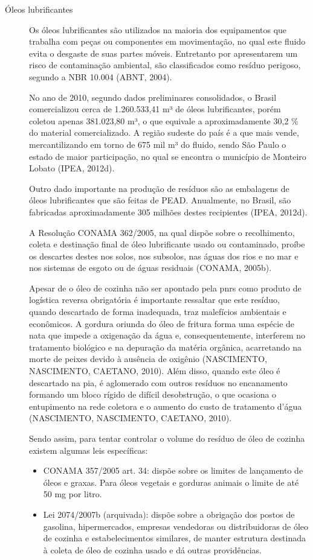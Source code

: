 \begin{description}
	
	\item[Óleos lubrificantes]	Os óleos lubrificantes são utilizados na maioria dos equipamentos que trabalha com peças ou componentes em movimentação, no qual este fluido evita o desgaste de suas partes móveis. Entretanto por apresentarem um risco de contaminação ambiental, são classificados como resíduo perigoso, segundo a NBR 10.004 (ABNT, 2004). 
	
	No ano de 2010, segundo dados preliminares consolidados, o Brasil comercializou cerca de 1.260.533,41 m³ de óleos lubrificantes, porém coletou apenas 381.023,80 m³, o que equivale a aproximadamente 30,2 \% do material comercializado. A região sudeste do país é a que mais vende, mercantilizando em torno de 675 mil m³ do fluido, sendo São Paulo o estado de maior participação, no qual se encontra o município de Monteiro Lobato (IPEA, 2012d). 
	
	Outro dado importante na produção de resíduos são as embalagens de óleos lubrificantes que são feitas de PEAD. Anualmente, no Brasil, são fabricadas aproximadamente 305 milhões destes recipientes (IPEA, 2012d).
	
	A Resolução CONAMA 362/2005, na qual dispõe sobre o recolhimento, coleta e destinação final de óleo lubrificante usado ou contaminado, proíbe os descartes destes nos solos, nos subsolos, nas águas dos rios e no mar e nos sistemas de esgoto ou de águas residuais (CONAMA, 2005b).
	
	Apesar de o óleo de cozinha não ser apontado pela \gls{pnrs} como produto de logística reversa obrigatória é importante ressaltar que este resíduo, quando descartado de forma inadequada, traz malefícios ambientais e econômicos. A gordura oriunda do óleo de fritura forma uma espécie de nata que impede a oxigenação da água e, consequentemente, interferem no tratamento biológico e na depuração da matéria orgânica, acarretando na morte de peixes devido à ausência de oxigênio (NASCIMENTO, NASCIMENTO, CAETANO, 2010). Além disso, quando este óleo é descartado na pia, é aglomerado com outros resíduos no encanamento formando um bloco rígido de difícil desobstrução, o que ocasiona o entupimento na rede coletora e o aumento do custo de tratamento d’água (NASCIMENTO, NASCIMENTO, CAETANO, 2010). 
	
	Sendo assim, para tentar controlar o volume do resíduo de óleo de cozinha existem algumas leis específicas: 
	
	\begin{itemize}
		\item CONAMA 357/2005 art. 34: dispõe sobre os limites de lançamento de óleos e graxas. Para óleos vegetais e gorduras animais o limite de até 50 mg por litro.
		\item Lei 2074/2007b (arquivada): dispõe sobre a obrigação dos postos de gasolina, hipermercados, empresas vendedoras ou distribuidoras de óleo de cozinha e estabelecimentos similares, de manter estrutura destinada à coleta de óleo de cozinha usado e dá outras providências. 
	\end{itemize}
	

\end{description}
